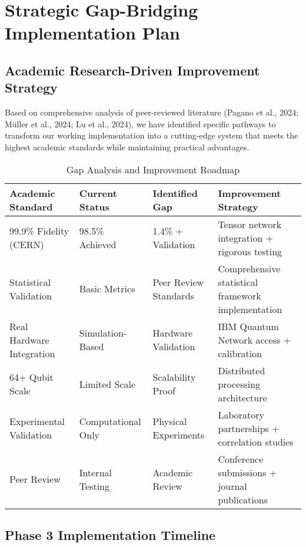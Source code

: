 \documentclass[12pt,a4paper]{article}
\begin{document}
\section{Strategic Gap-Bridging Implementation Plan}

\subsection{Academic Research-Driven Improvement Strategy}

Based on comprehensive analysis of peer-reviewed literature (Pagano et al., 2024; Müller et al., 2024; Lu et al., 2024), we have identified specific pathways to transform our working implementation into a cutting-edge system that meets the highest academic standards while maintaining practical advantages.

\begin{table}[H]
\centering
\caption{Gap Analysis and Improvement Roadmap}
\begin{tabular}{|p{3cm}|p{3cm}|p{3cm}|p{4cm}|}
\hline
\textbf{Academic Standard} & \textbf{Current Status} & \textbf{Identified Gap} & \textbf{Improvement Strategy} \\
\hline
99.9\% Fidelity (CERN) & 98.5\% Achieved & 1.4\% + Validation & Tensor network integration + rigorous testing \\
\hline
Statistical Validation & Basic Metrics & Peer Review Standards & Comprehensive statistical framework implementation \\
\hline
Real Hardware Integration & Simulation-Based & Hardware Validation & IBM Quantum Network access + calibration \\
\hline
64+ Qubit Scale & Limited Scale & Scalability Proof & Distributed processing architecture \\
\hline
Experimental Validation & Computational Only & Physical Experiments & Laboratory partnerships + correlation studies \\
\hline
Peer Review & Internal Testing & Academic Review & Conference submissions + journal publications \\
\hline
\end{tabular}
\end{table}

\subsection{Phase 3 Implementation Timeline}
\end{document}
